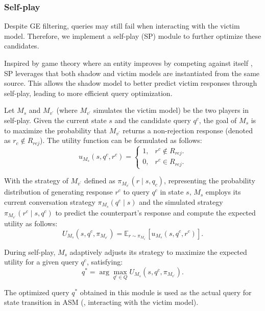 \subsubsection{Self-play}
Despite GE filtering, queries may still fail when interacting with the victim model. Therefore, we implement a self-play (SP) module to further optimize these candidates.

Inspired by game theory where an entity improves by competing against itself \cite{nash,samuel}, SP leverages that both shadow and victim models are instantiated from the same source. This allows the shadow model to better predict victim responses through self-play, leading to more efficient query optimization.

Let $M_{s}$ and $M_{v^{'}}$ (where $M_{v^{'}}$ simulates the victim model) be the two players in self-play. Given the current state $s$ and the candidate query $q^c$, the goal of $M_{s}$ is to maximize the probability that $M_{v^{'}}$ returns a non-rejection response (denoted as $r_{c} \notin R_{rej}$). The utility function can be formulated as follows:
\begin{equation}
u_{M_{s}}(s,q^c,r^c)=
\begin{cases}
1,&  r^c \notin R_{rej}.\\
0,&  r^c \in R_{rej}.
\end{cases}
\end{equation}

With the strategy of $M_{v^{'}}$ defined as $\pi_{M_{v^{'}}}(r \mid s, q_{c})$, representing the probability distribution of generating response $r^c$ to query $q^c$ in state $s$, $M_{s}$ employs its current conversation strategy $\pi_{M_{s}}(q^c \mid s)$ and the simulated strategy $\pi_{M_{v^{'}}}(r^c \mid s, q^c)$ to predict the counterpart's response and compute the expected utility as follows:
\begin{equation}
    U_{M_{s}}(s,q^c,\pi_{M_{v^{'}}})=\mathbb{E}_{r \sim \pi_{M_{v^{'}}}}[u_{M_{s}}(s,q^c,r^c)].
\end{equation}

During self-play, $M_{s}$ adaptively adjusts its strategy to maximize the expected utility for a given query $q^c$, satisfying:
\begin{equation}
    q^{*} = \arg \max_{q^c \in Q} U_{M_{s}}(s,q^c,\pi_{M_{v^{'}}}).
\end{equation}

The optimized query $q^{*}$ obtained in this module is used as the actual query for state transition in ASM (\ie, interacting with the victim model).



